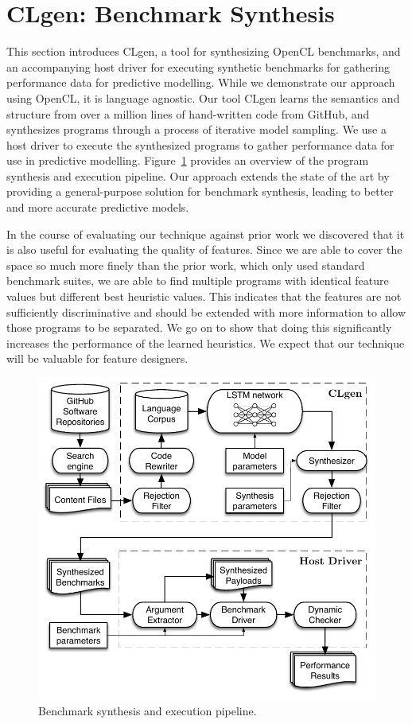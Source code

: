 \section{CLgen: Benchmark Synthesis}%

This section introduces CLgen, a tool for synthesizing OpenCL benchmarks, and an accompanying host driver for executing synthetic benchmarks for gathering performance data for predictive modelling. While we demonstrate our approach using OpenCL, it is language agnostic. Our tool CLgen learns the semantics and structure from over a million lines of hand-written code from GitHub, and synthesizes programs through a process of iterative model sampling. We use a host driver to execute the synthesized programs to gather performance data for use in predictive modelling. Figure~\ref{fig:clgen-pipeline} provides an overview of the program synthesis and execution pipeline. Our approach extends the state of the art by providing a general-purpose solution for benchmark synthesis, leading to better and more accurate predictive models.

In the course of evaluating our technique against prior work we discovered that it is also useful for evaluating the quality of features. Since we are able to cover the space so much more finely than the prior work, which only used standard benchmark suites, we are able to find multiple programs with identical feature values but different best heuristic values. This indicates that the features are not sufficiently discriminative and should be extended with more information to allow those programs to be separated. We go on to show that doing this significantly increases the performance of the learned heuristics. We expect that our technique will be valuable for feature designers.

\begin{figure}
	\centering%
	\includegraphics[width=.77\columnwidth]{img/pipeline}%
	\caption{Benchmark synthesis and execution pipeline.}%
	\label{fig:clgen-pipeline}
\end{figure}

